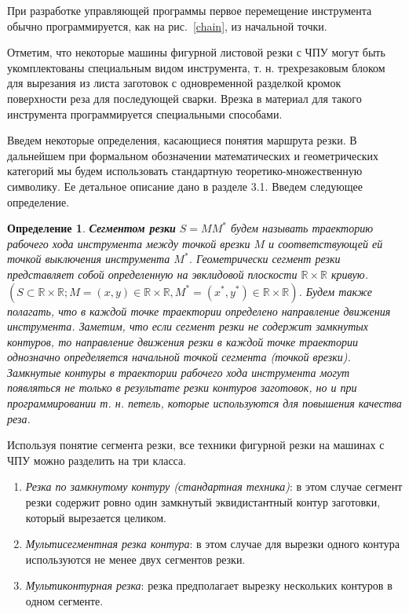 \documentclass[11pt,twoside,openany]{report}
\newcounter{theo}
\newcounter{pred}
\newcounter{opred}
\newtheorem{opred}{Определение}[section]
\begin{document}
При разработке управляющей программы
первое перемещение инструмента обычно
программируется, как на рис.~\ref{chain},
из начальной точки.

Отметим, что некоторые машины фигурной листовой
резки с ЧПУ могут быть укомплектованы
специальным видом инструмента,
т. н. трехрезаковым блоком для вырезания
из листа заготовок с одновременной разделкой
кромок поверхности реза для последующей сварки.
Врезка в материал для такого инструмента
программируется специальными способами.

Введем некоторые определения,
касающиеся понятия маршрута резки.
В дальнейшем при формальном обозначении
математических и геометрических категорий
мы будем использовать стандартную
теоретико-множественную символику.
Ее детальное описание дано в разделе 3.1.
Введем следующее определение.

\begin{opred}
\label{def:cutting-segment}
{\bf Сегментом резки}
$S=MM^*$
будем называть траекторию рабочего хода
инструмента между точкой врезки
$M$
и соответствующей ей точкой выключения инструмента
$M^*$.
Геометрически сегмент резки представляет собой
определенную на эвклидовой плоскости
$\mathbb R \times \mathbb R$
кривую.
$(S \subset \mathbb R \times \mathbb R;
M=(x,y) \in \mathbb R \times \mathbb R,
M^* =(x^*,y^*)\in \mathbb R \times \mathbb R)$.
Будем также полагать,
что в каждой точке траектории определено направление движения инструмента.
Заметим, что если сегмент резки не содержит замкнутых контуров,
то направление движения резки в каждой точке траектории
однозначно определяется начальной точкой сегмента
(точкой врезки).
Замкнутые контуры в траектории рабочего хода инструмента
могут появляться не только в результате резки контуров заготовок,
но и при программировании т. н. петель,
которые используются для повышения качества реза.
\end{opred}

Используя понятие сегмента резки,
все техники фигурной резки на машинах с ЧПУ
можно разделить на три класса.
\begin{enumerate}
  \item
  {\it Резка по замкнутому контуру (стандартная техника)}:
  в этом случае сегмент резки содержит
  ровно один замкнутый эквидистантный контур заготовки,
  который вырезается целиком.
  \item
  {\it Мультисегментная резка контура}:
  в этом случае для вырезки одного контура
  используются не менее двух сегментов резки.
  \item
  {\it Мультиконтурная резка}:
  резка предполагает вырезку нескольких
  контуров в одном сегменте.
\end{enumerate}
\end{document}
